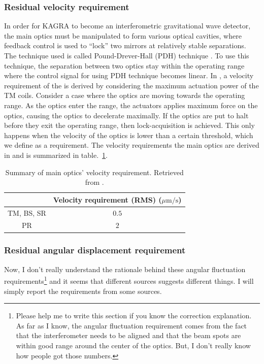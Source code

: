 \subsubsection{Residual velocity requirement}
In order for KAGRA to become an interferometric gravitational wave detector, the main optics must be manipulated to form various optical cavities, where feedback control is used to ``lock'' two mirrors at relatively stable separations.
The technique used is called Pound-Drever-Hall (PDH) technique \cite{doi:10.1119/1.1286663}.
To use this technique, the separation between two optics stay within the operating range where the control signal for using PDH technique becomes linear.
In \cite{Sekiguchi:2016bmv}, a velocity requirement of the is derived by considering the maximum actuation power of the TM coils.
Consider a case where the optics are moving towards the operating range.
As the optics enter the range, the actuators applies maximum force on the optics, causing the optics to decelerate maximally.
If the optics are put to halt before they exit the operating range, then lock-acquisition is achieved.
This only happens when the velocity of the optics is lower than a certain threshold, which we define as a requirement.
The velocity requirements the main optics are derived in \cite{Sekiguchi:2016bmv} and is summarized in table.~\ref{table:velocity_requirement}.
\begin{table}[!h]
	\centering
	\begin{tabular}{|c|c|}
		\hline
		& Velocity requirement (RMS) ($\mu\mathrm{m}/\mathrm{s}$)\\
		\hline
		TM, BS, SR &  $0.5$\\
		\hline
		PR &  $2$\\
		\hline
	\end{tabular}
	\caption{Summary of main optics' velocity requirement. Retrieved from \cite{Sekiguchi:2016bmv}.}
	\label{table:velocity_requirement}
\end{table}

\subsubsection{Residual angular displacement requirement}
Now, I don't really understand the rationale behind these angular fluctuation requirements\footnote{Please help me to write this section if you know the correction explanation. As far as I know, the angular fluctuation requirement comes from the fact that the interferometer needs to be aligned and that the beam spots are within good range around the center of the optics. But, I don't really know how people got those numbers.} and it seems that different sources suggests different things. I will simply report the requirements from some sources. 

